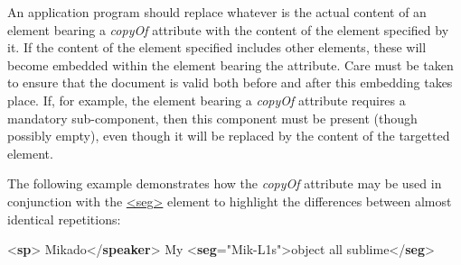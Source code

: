An application program should replace whatever is the actual content of an element bearing a {\itshape copyOf} attribute with the content of the element specified by it. If the content of the element specified includes other elements, these will become embedded within the element bearing the attribute. Care must be taken to ensure that the document is valid both before and after this embedding takes place. If, for example, the element bearing a {\itshape copyOf} attribute requires a mandatory sub-component, then this component must be present (though possibly empty), even though it will be replaced by the content of the targetted element.\par
The following example demonstrates how the {\itshape copyOf} attribute may be used in conjunction with the \hyperref[TEI.seg]{<seg>} element to highlight the differences between almost identical repetitions: \par\bgroup{}\exampleFont \begin{shaded}\noindent\mbox{}{<\textbf{sp}>}\mbox{}\newline 
{}Mikado{</\textbf{speaker}>}\mbox{}\newline 
{}My {<\textbf{seg}\hspace*{1em}{xml:id}="{Mik-L1s}">}object all sublime{</\textbf{seg}>}\mbox{}\newline 

\end{shaded}
